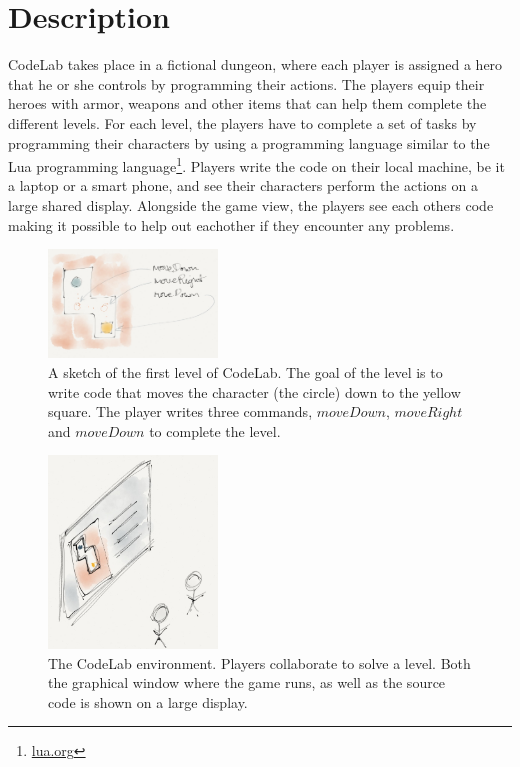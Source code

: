 \documentclass[12pt,journal,compsoc]{IEEEtran}
\begin{document}
\section{Description} 
CodeLab takes place in a fictional dungeon, where each player is assigned a
hero that he or she controls by programming their actions. The players equip
their heroes with armor, weapons and other items that can help them complete the
different levels. For each level, the players have to complete a set of tasks by
programming their characters by using a programming language similar to the 
Lua programming language\footnote{\url{lua.org}}. Players 
write the code on their local machine, be it a laptop or a smart phone, and see
their characters perform the actions on a large shared display. Alongside the
game view, the players see each others code making it possible to help out
eachother if they encounter any problems. 
\begin{figure}[htb]
    \begin{centering}
    \includegraphics[width=0.4\textwidth]{./figures/codelab3.png}
    \caption{A sketch of the first level of CodeLab. The goal of the level
    is to write code that moves the character (the circle) down to the
    yellow square. The player writes three commands, $moveDown$,
    $moveRight$ and $moveDown$ to complete the level. } 
    \label{fig:level1}
    \end{centering} 
\end{figure}


\begin{figure}[htb]
    \begin{centering}
    \includegraphics[width=0.4\textwidth]{./figures/codelab2.png}
    \caption{The CodeLab environment. Players collaborate to solve a level. Both
    the graphical window where the game runs, as well as the source code is
    shown on a large display. } 
    \label{fig:environ}
    \end{centering} 
\end{figure}
\end{document}
